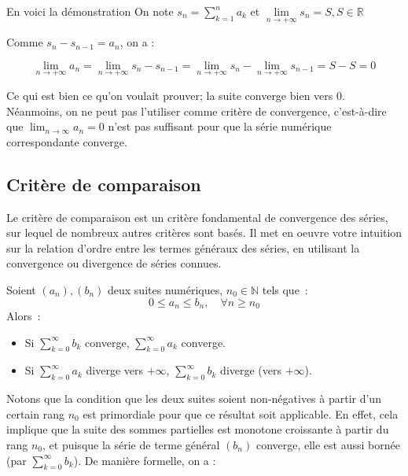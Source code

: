 En voici la démonstration 
On note $s_n = \sum_{k=1}^{n} a_k$ et $\lim\limits_{n \rightarrow + \infty} s_n = S, S \in \mathbb{R}$

Comme $s_n - s_{n-1} = a_n$, on a :

$$\lim\limits_{n \rightarrow + \infty} a_n = \lim\limits_{n \rightarrow + \infty} s_n - s_{n-1} = \lim\limits_{n \rightarrow + \infty} s_n - \lim\limits_{n \rightarrow + \infty} s_{n-1} = S -S = 0$$

Ce qui est bien ce qu'on voulait prouver; la suite converge bien vers $0$.  Néanmoins, on ne peut pas l'utiliser comme critère de convergence, c'est-à-dire que $\displaystyle\lim_{n \to \infty} a_n = 0$ n'est pas suffisant pour que la série numérique correspondante converge.


\subsection{Critère de comparaison}
Le critère de comparaison est un critère fondamental de convergence des séries, sur lequel de nombreux autres critères sont basés. Il met en oeuvre votre intuition sur la relation d'ordre entre les termes généraux des séries, en utilisant la convergence ou divergence de séries connues.

\begin{boxdef}
Soient $(a_n), (b_n)$ deux suites numériques, $n_0 \in \mathbb{N}$ tels que~:
\begin{equation}
0 \leq a_n \leq b_n, \quad \forall n \geq n_0
\end{equation}
Alors~:
\begin{itemize}
    \item Si $\displaystyle\sum_{k=0}^{\infty} b_k$ converge, $\displaystyle\sum_{k=0}^{\infty} a_k$ converge.
    \item Si $\displaystyle\sum_{k=0}^{\infty} a_k$ diverge vers $+\infty$, $\displaystyle\sum_{k=0}^{\infty} b_k$ diverge (vers $+\infty$).
\end{itemize}
\end{boxdef}
Notons que la condition que les deux suites soient non-négatives à partir d'un certain rang $n_0$ est primordiale pour que ce résultat soit applicable. En effet, cela implique que la suite des sommes partielles est monotone croissante à partir du rang $n_0$, et puisque la série de terme général $(b_n)$ converge, elle est aussi bornée (par $\displaystyle\sum_{k = 0}^{\infty} b_k$). De manière formelle, on a :

